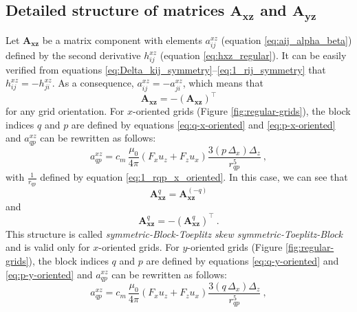 \documentclass[manuscript]{geophysics}
\begin{document}
	\subsection{Detailed structure of matrices $\mathbf{A_{xz}}$ and $\mathbf{A_{yz}}$}
	
	Let $\mathbf{A}_{\boldsymbol{xz}}$ be a matrix component with elements
	$a^{xz}_{ij}$ (equation \ref{eq:aij_alpha_beta}) defined by the second derivative
	$h^{xz}_{ij}$ (equation \ref{eq:hxz_regular}). It can be easily verified from equations
	\ref{eq:Delta_kij_symmetry}--\ref{eq:1_rij_symmetry} that $h^{xz}_{ij} = -h^{xz}_{ji}$.
	As a consequence, $a^{xz}_{ij} = -a^{xz}_{ji}$, which means that 
	\begin{equation}
		\mathbf{A}_{\boldsymbol{xz}} = -\left( \mathbf{A}_{\boldsymbol{xz}} \right)^{\top}
		\label{eq:Axz_symmetry}
	\end{equation} 
	for any grid orientation.
	For $x$-oriented grids (Figure \ref{fig:regular-grids}), the block indices $q$ and $p$ are defined 
	by equations \ref{eq:q-x-oriented} and 
	\ref{eq:p-x-oriented} and $a^{xz}_{qp}$ can be rewritten as follows:
	\begin{equation}
		a^{xz}_{qp} = c_{m} \, \frac{\mu_{0}}{4\pi} 
		\left( F_{x} u_{z} + F_{z} u_{x} \right) \frac{3 \left( p \, \Delta_{x} \right) \Delta_{z}}{r_{qp}^{5}}
		\: ,
		\label{eq:aqp_xz_x_oriented}
	\end{equation}
	with $\tfrac{1}{r_{qp}}$ defined by equation \ref{eq:1_rqp_x_oriented}.
	In this case, we can see that
	\begin{equation}
		\mathbf{A}_{\boldsymbol{xz}}^{q} = \mathbf{A}_{\boldsymbol{xz}}^{(-q)}
		\label{eq:Axz_q_external_block_symmetry_x_oriented}
	\end{equation}
	and 
	\begin{equation}
		\mathbf{A}_{\boldsymbol{xz}}^{q} = -\left( \mathbf{A}_{\boldsymbol{xz}}^{q} \right)^{\top} \: .
		\label{eq:Axz_q_internal_block_symmetry_x_oriented}
	\end{equation}
	This structure is called \textit{symmetric-Block-Toeplitz skew symmetric-Toeplitz-Block} and is 
	valid only for $x$-oriented grids.
	For $y$-oriented grids (Figure \ref{fig:regular-grids}), the block indices $q$ and $p$ are 
	defined by equations \ref{eq:q-y-oriented} and 
	\ref{eq:p-y-oriented} and $a^{xz}_{qp}$ can be rewritten as follows:
	\begin{equation}
		a^{xz}_{qp} = c_{m} \, \frac{\mu_{0}}{4\pi} 
		\left( F_{x} u_{z} + F_{z} u_{x} \right) \frac{3 \left( q \, \Delta_{x} \right) \Delta_{z}}{r_{qp}^{5}} \: ,
		\label{eq:aqp_xz_y_oriented}
	\end{equation}
\end{document}
